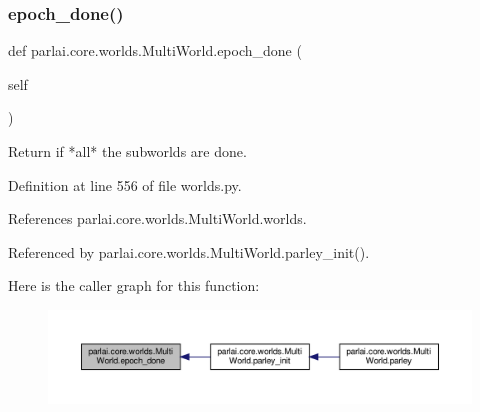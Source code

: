 \mbox{\label{classparlai_1_1core_1_1worlds_1_1MultiWorld_a7034326fa264402e0857a98d1ec688de}} 
\subsubsection{\texorpdfstring{epoch\+\_\+done()}{epoch\_done()}}
{\footnotesize\ttfamily def parlai.\+core.\+worlds.\+Multi\+World.\+epoch\+\_\+done (\begin{DoxyParamCaption}\item[{}]{self }\end{DoxyParamCaption})}

\begin{DoxyVerb}Return if *all* the subworlds are done.\end{DoxyVerb}
 

Definition at line 556 of file worlds.\+py.



References parlai.\+core.\+worlds.\+Multi\+World.\+worlds.



Referenced by parlai.\+core.\+worlds.\+Multi\+World.\+parley\+\_\+init().

Here is the caller graph for this function\+:
\nopagebreak
\begin{figure}[H]
\begin{center}
\leavevmode
\includegraphics[width=350pt]{classparlai_1_1core_1_1worlds_1_1MultiWorld_a7034326fa264402e0857a98d1ec688de_icgraph}
\end{center}
\end{figure}
\mbox{\label{classparlai_1_1core_1_1worlds_1_1MultiWorld_a73074f333544de25b4e07ffc48819896}} 
